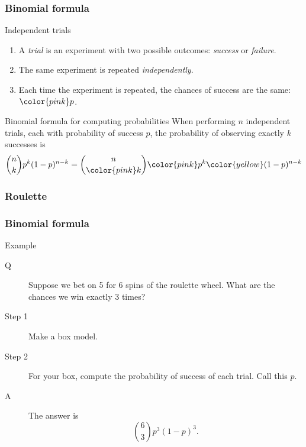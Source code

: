 \documentclass[handout]{beamer}
\begin{document}

   \begin{frame} \frametitle{Binomial formula}

   \begin{block}
   {Independent trials}
   \begin{enumerate}
   \item A {\em trial} is an experiment with two possible outcomes:
   {\color{pink} \em success} or {\color{yellow} \em failure}.
   \item The same experiment is repeated {\em independently}.
   \item Each time the experiment is repeated, the chances of success are the
   same: ${\color{pink} p}$.
   \end{enumerate}
   \end{block}

   \begin{block}
   {Binomial formula for computing probabilities}
   When performing $n$ independent trials, each
   with probability of success $p$, the probability
   of observing exactly $k$ successes is
   $$
   \binom{n}{ k} { p^k} {(1-p)^ {n-k}} = \binom{n}{{\color{pink} k}} {\color{pink} p^k} {\color{yellow}(1-p)^ {n-k}}
   $$
   \end{block}
   \end{frame}


   \begin{frame} \frametitle{Roulette}

   \begin{figure}
   \centering
   \end{figure}
   \end{frame}


   \begin{frame} \frametitle{Binomial formula}

   \begin{block}
   {Example}
   \begin{description}

   \item[Q] Suppose we bet on {\color{red} 5} for 6 spins of the roulette wheel.
   What are the chances we win exactly 3 times?

   \item[Step 1] Make a box model.
   \item[Step 2] For your box, compute the probability of success of each trial. Call this $p$.
   \item[A] The answer is
   $$
   \binom{6}{3} p^3 (1-p)^3.
   $$
   \end{description}
   \end{block}
   \end{frame}
\end{document}
